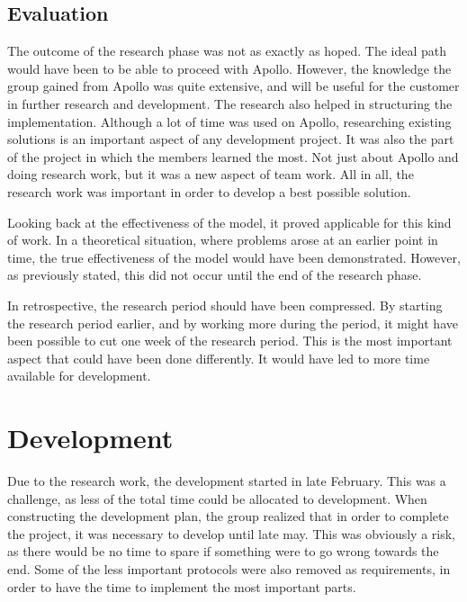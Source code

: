\subsection{Evaluation}
\label{subsec:project_evaluation-research_phase-evaluation}

The outcome of the research phase was not as exactly as hoped. The ideal path would have been to be able to proceed with Apollo. However, the knowledge the group gained from Apollo was quite extensive, and will be useful for the customer in further research and development. The research also helped in structuring the implementation. Although a lot of time was used on Apollo, researching existing solutions is an important aspect of any development project. It was also the part of the project in which the members learned the most. Not just about Apollo and doing research work, but it was a new aspect of team work. All in all, the research work was important in order to develop a best possible solution.

Looking back at the effectiveness of the model, it proved applicable for this kind of work. In a theoretical situation, where problems arose at an earlier point in time, the true effectiveness of the model would have been demonstrated. However, as previously stated, this did not occur until the end of the research phase.

In retrospective, the research period should have been compressed. By starting the research period earlier, and by working more during the period, it might have been possible to cut one week of the research period. This is the most important aspect that could have been done differently. It would have led to more time available for development.

\section{Development}
\label{sec:project_evaluation-development}

Due to the research work, the development started in late February. This was a challenge, as less of the total time could be allocated to development. When constructing the development plan, the group realized that in order to complete the project, it was necessary to develop until late may. This was obviously a risk, as there would be no time to spare if something were to go wrong towards the end. Some of the less important protocols were also removed as requirements, in order to have the time to implement the most important parts.

